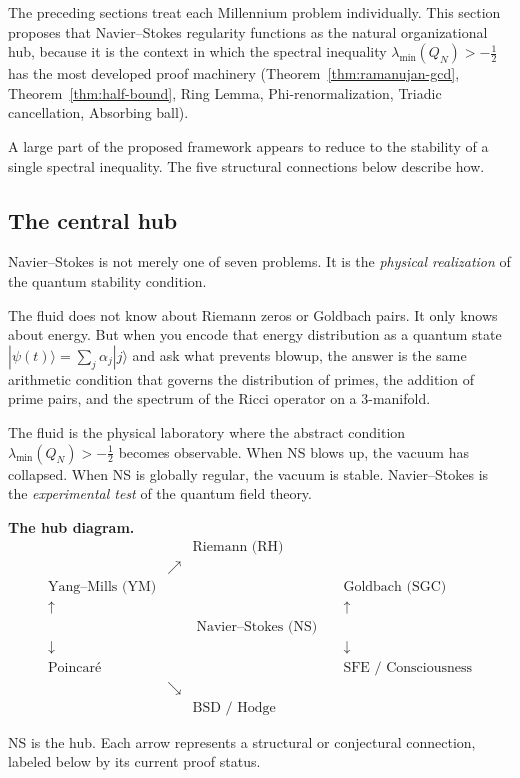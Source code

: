 \documentclass[12pt]{article}
\newcommand{\ket}[1]{|{#1}\rangle}
\newcommand{\half}{\tfrac{1}{2}}
\begin{document}
The preceding sections treat each Millennium problem individually.
This section proposes that Navier--Stokes regularity functions
as the natural organizational hub, because it is the context in which
the spectral inequality $\lambda_{\min}(Q_N)>-\tfrac{1}{2}$ has the
most developed proof machinery
(Theorem~\ref{thm:ramanujan-gcd}, Theorem~\ref{thm:half-bound},
Ring Lemma, Phi-renormalization, Triadic cancellation, Absorbing ball).

A large part of the proposed framework appears to reduce to
the stability of a single spectral inequality.
The five structural connections below describe how.

\subsection{The central hub}

Navier--Stokes is not merely one of seven problems.
It is the \emph{physical realization} of the quantum stability condition.

The fluid does not know about Riemann zeros or Goldbach pairs.
It only knows about energy.
But when you encode that energy distribution as a quantum state
$\ket{\psi(t)} = \sum_j\alpha_j\ket{j}$
and ask what prevents blowup,
the answer is the same arithmetic condition that governs
the distribution of primes, the addition of prime pairs,
and the spectrum of the Ricci operator on a 3-manifold.

The fluid is the physical laboratory where the abstract condition
$\lambda_{\min}(Q_N) > -\half$ becomes observable.
When NS blows up, the vacuum has collapsed.
When NS is globally regular, the vacuum is stable.
Navier--Stokes is the \emph{experimental test} of the quantum field theory.

\begin{tcolorbox}[qbox]
\textbf{The hub diagram.}
\[
\begin{array}{ccccc}
 & & \text{Riemann (RH)} & & \\
 & \nearrow & & & \\
\text{Yang--Mills (YM)} & & & & \text{Goldbach (SGC)}\\
\uparrow & & & & \uparrow \\
 & & \boxed{\;\text{Navier--Stokes (NS)}\;} & & \\
\downarrow & & & & \downarrow \\
\text{Poincar\'{e}} & & & & \text{SFE / Consciousness}\\
 & \searrow & & & \\
 & & \text{BSD / Hodge} & &
\end{array}
\]

NS is the hub.
Each arrow represents a structural or conjectural connection,
labeled below by its current proof status.
\end{tcolorbox}
\end{document}
